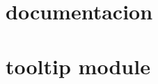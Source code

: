 \documentclass[letterpaper,10pt,spanish]{sphinxmanual}
\begin{document}
\sphinxstepscope


\chapter{documentacion}
\label{\detokenize{modules:documentacion}}\label{\detokenize{modules::doc}}
\sphinxstepscope


\chapter{tooltip module}
\label{\detokenize{tooltip:module-tooltip}}\label{\detokenize{tooltip:tooltip-module}}\label{\detokenize{tooltip::doc}}
\end{document}
